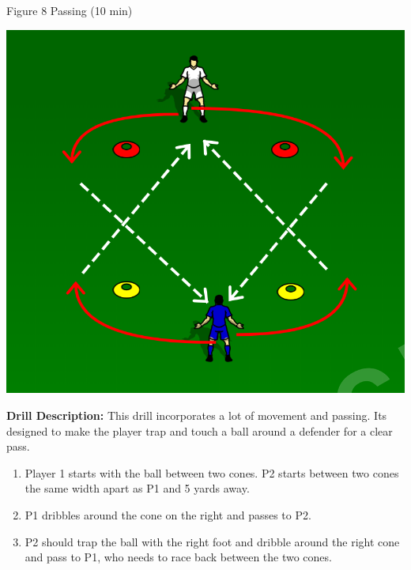 \begin{evenBlock}{Figure 8 Passing (10 min)}

\begin{minipage}[t]{\linewidth}
    \centering
    
    \begin{minipage}{.3\linewidth} %
        \includegraphics[width=\textwidth]{../img/Trimmed/Figure-8}
    \end{minipage}
    \hspace{0.05\linewidth}
    \begin{minipage}{.6\linewidth} %
        \textbf{Drill Description:}
        This drill incorporates a lot of movement and passing.  Its designed to make the player trap and touch a ball around a defender for a clear pass.
        \begin{enumerate}
            \setlength{\itemsep}{0pt}
            \setlength{\parskip}{0pt}
            \setlength{\parsep}{0pt}
            \item Player 1 starts with the ball between two cones.  P2 starts between two cones the same width apart as P1 and 5 yards away.
            \item P1 dribbles around the cone on the right and passes to P2.
            \item P2 should trap the ball with the right foot and dribble around the right cone and pass to P1, who needs to race back between the two cones.

\end{enumerate}
\end{minipage}
\end{minipage}
\end{evenBlock}
